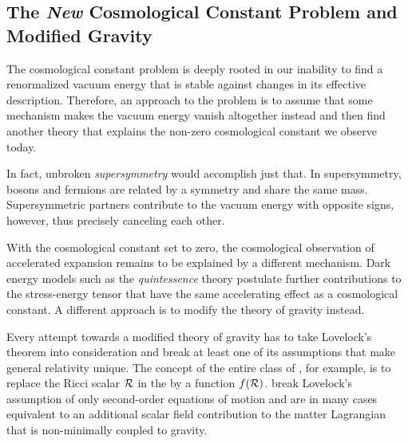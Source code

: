 \documentclass[12pt,parskip=half]{scrreprt}
\begin{document}

\subsection{The \emph{New} Cosmological Constant Problem and Modified Gravity}\label{sec:cc_problem_new}

The cosmological constant problem is deeply rooted in our inability to find a renormalized vacuum energy that is stable against changes in its effective description. Therefore, an approach to the problem is to assume that some mechanism makes the vacuum energy vanish altogether instead and then find another theory that explains the non-zero cosmological constant we observe today.

In fact, unbroken \emph{supersymmetry} would accomplish just that. In supersymmetry, bosons and fermions are related by a symmetry and share the same mass. Supersymmetric partners contribute to the vacuum energy with opposite signs, however, thus precisely canceling each other.

With the cosmological constant set to zero, the cosmological observation of accelerated expansion  remains to be explained by a different mechanism. Dark energy models such as the \emph{quintessence} theory  postulate further contributions to the stress-energy tensor that have the same accelerating effect as a cosmological constant. A different approach is to modify the theory of gravity instead.

Every attempt towards a modified theory of gravity has to take Lovelock's theorem into consideration and break at least one of its assumptions that make general relativity unique. The concept of the entire class of \emph{}, for example, is to replace the Ricci scalar \(\mathcal{R}\) in the  by a function \(f(\mathcal{R})\).
 break Lovelock's assumption of only second-order equations of motion and are in many cases equivalent to an additional scalar field contribution to the matter Lagrangian that is non-minimally coupled to gravity. 
\end{document}

